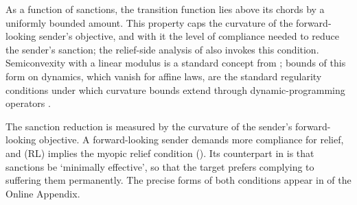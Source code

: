  As a function of sanctions,
the transition function lies above its chords by a uniformly bounded amount. This property caps the curvature of the forward-looking
sender's objective, and with it the level of compliance needed to reduce the sender's
sanction; the relief-side analysis of  also invokes this
condition. Semiconvexity with a linear modulus is a standard concept from
\citet[Prop.~1.1.3 and Def.~2.1.1]{CannarsaSinestrari2004}; bounds of this form on
dynamics, which vanish for affine laws, are the standard regularity conditions under
which curvature bounds extend through dynamic-programming operators
\citep[Thm.~III.3.26]{BardiCapuzzoDolcetta1997}.

 The sanction reduction is measured by the curvature of the sender's
forward-looking objective. A forward-looking
sender demands more compliance for relief, and \textup{(RL)} implies the myopic relief
condition (). Its counterpart in \citet[p.~915]{Eaton1992} is
that sanctions be `minimally effective', so that the target prefers complying to
suffering them permanently. The precise forms of both conditions appear in
 of the Online Appendix.


